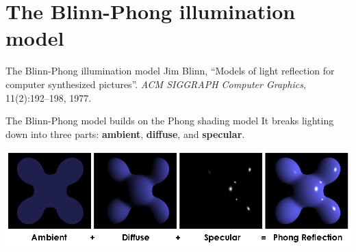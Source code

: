 \part{The Blinn-Phong illumination model}
\frame{\partpage}

\begin{frame}{The Blinn-Phong illumination model}
	\pause Jim Blinn,
	``Models of light reflection for computer synthesized pictures''.
	\textit{ACM SIGGRAPH Computer Graphics},
	11(2):192--198,
	1977.
	
	\pause The Blinn-Phong model builds on the Phong shading model
	\pause It breaks lighting down into three parts:
		\textbf{ambient}, \textbf{diffuse}, and \textbf{specular}.
		
	\pause\includegraphics[width=\textwidth]{phong}
\end{frame}

